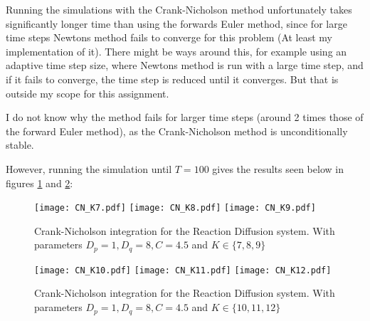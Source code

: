 \documentclass[a4paper,10pt]{article}
\begin{document}
	Running the simulations with the Crank-Nicholson method unfortunately takes significantly longer time than using the forwards Euler method, since for large time steps Newtons method fails to converge for this problem (At least my implementation of it). There might be ways around this, for example using an adaptive time step size, where Newtons method is run with a large time step, and if it fails to converge, the time step is reduced until it converges. But that is outside my scope for this assignment.
	
	I do not know why the method fails for larger time steps (around 2 times those of the forward Euler method), as the Crank-Nicholson method is unconditionally stable.
	
	However, running the simulation until $ T=100 $ gives the results seen below in figures \ref{fig:CN1} and \ref{fig:CN2}:
	\begin{figure}[H]
		\centering
		\texttt{[image: CN\_K7.pdf]}
		\texttt{[image: CN\_K8.pdf]}
		\texttt{[image: CN\_K9.pdf]}
		\caption{Crank-Nicholson integration for the Reaction Diffusion system. With parameters $ D_p=1, D_q = 8, C=4.5 $ and $ K \in \{7, 8, 9\} $}
		\label{fig:CN1}
	\end{figure}
	\begin{figure}[H]
		\centering
		\texttt{[image: CN\_K10.pdf]}
		\texttt{[image: CN\_K11.pdf]}
		\texttt{[image: CN\_K12.pdf]}
		\caption{Crank-Nicholson integration for the Reaction Diffusion system. With parameters $ D_p=1, D_q = 8, C=4.5 $ and $ K \in \{10,11,12\} $}
		\label{fig:CN2}
	\end{figure}
\end{document}
